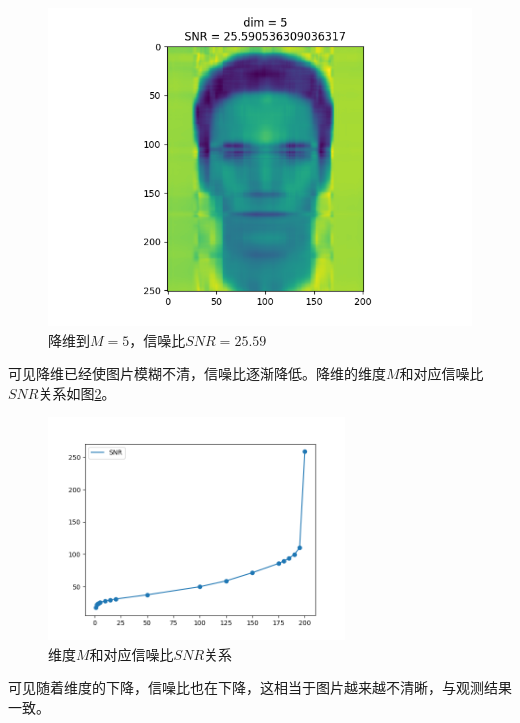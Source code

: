 \begin{figure}[htbp]
\begin{minipage}[t]{0.3\linewidth}
        \includegraphics[width=\textwidth]{figures/Figure_19.png}
        \caption{降维到$M=5$，信噪比$SNR=25.59$}
        \label{m5}
    \end{minipage}
\end{figure}

可见降维已经使图片模糊不清，信噪比逐渐降低。降维的维度$M$和对应信噪比$SNR$关系如图\ref{snr}。

\begin{figure}[htbp]
    \centering
    \includegraphics[width=0.7\textwidth]{figures/Figure_20.png}
    \caption{维度$M$和对应信噪比$SNR$关系}
    \label{snr}
\end{figure}

可见随着维度的下降，信噪比也在下降，这相当于图片越来越不清晰，与观测结果一致。
